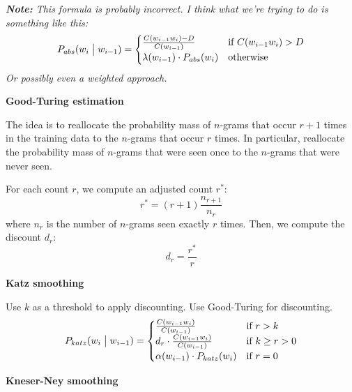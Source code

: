 \documentclass[11pt]{article}
\begin{document}
\vspace{10pt}

\textit{\textbf{Note:} This formula is probably incorrect. I think what we're trying to do is something like this:
    \begin{equation*}
        P_{abs}(w_i \bigm| w_{i-1}) = \begin{cases}
            \frac{C(w_{i-1}w_i) - D}{C(w_{i-1})} & \mbox{if } C(w_{i-1}w_i) > D \\
            \lambda(w_{i-1}) \cdot P_{abs}(w_i) & \mbox{otherwise}
        \end{cases}
    \end{equation*}
    Or possibly even a weighted approach.
}

\vspace{20pt}
\textbf{Good-Turing estimation}
\vspace{10pt}

The idea is to reallocate the probability mass of $n$-grams that occur $r+1$ times in the training data to the $n$-grams that occur $r$ times. In particular, reallocate the probability mass of $n$-grams that were seen once to the $n$-grams that were never seen.

For each count $r$, we compute an adjusted count $r^\ast$:
\[
    r^\ast = (r+1)\frac{n_{r+1}}{n_r}
\]
where $n_r$ is the number of $n$-grams seen exactly $r$ times. Then, we compute the discount $d_r$:
\[
    d_r = \frac{r^\ast}{r}
\]

\vspace{20pt}
\textbf{Katz smoothing}
\vspace{10pt}

Use $k$ as a threshold to apply discounting. Use Good-Turing for discounting.
\begin{equation*}
    P_{katz}(w_i \bigm| w_{i-1}) = \begin{cases}
                                       \frac{C(w_{i-1}w_i)}{C(w_{i-1})} & \mbox{if } r > k \\
                                       d_r \cdot \frac{C(w_{i-1}w_i)}{C(w_{i-1})} & \mbox{if } k \geq r > 0 \\
                                       \alpha(w_{i-1}) \cdot P_{katz}(w_{i}) & \mbox{if } r = 0
                                   \end{cases}
\end{equation*}

\vspace{20pt}
\textbf{Kneser-Ney smoothing}
\vspace{10pt}
\end{document}

